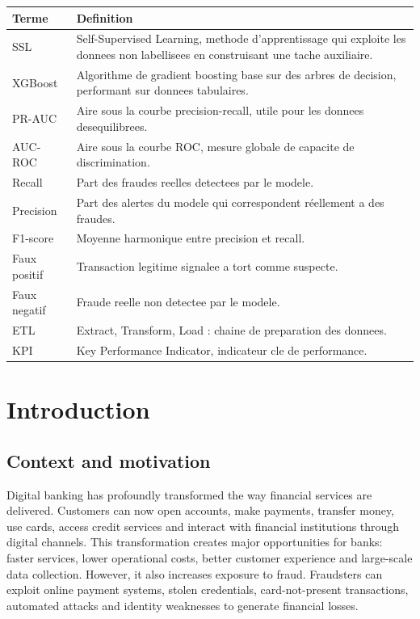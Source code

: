 \documentclass[12pt,a4paper]{report}
\begin{document}
\begin{longtable}{p{3cm}p{11cm}}
\toprule
\textbf{Terme} & \textbf{Definition} \\
\midrule
SSL & Self-Supervised Learning, methode d'apprentissage qui exploite les donnees non labellisees en construisant une tache auxiliaire. \\
XGBoost & Algorithme de gradient boosting base sur des arbres de decision, performant sur donnees tabulaires. \\
PR-AUC & Aire sous la courbe precision-recall, utile pour les donnees desequilibrees. \\
AUC-ROC & Aire sous la courbe ROC, mesure globale de capacite de discrimination. \\
Recall & Part des fraudes reelles detectees par le modele. \\
Precision & Part des alertes du modele qui correspondent réellement a des fraudes. \\
F1-score & Moyenne harmonique entre precision et recall. \\
Faux positif & Transaction legitime signalee a tort comme suspecte. \\
Faux negatif & Fraude reelle non detectee par le modele. \\
ETL & Extract, Transform, Load : chaine de preparation des donnees. \\
KPI & Key Performance Indicator, indicateur cle de performance. \\
\bottomrule
\end{longtable}

\chapter{Introduction}

\section{Context and motivation}

Digital banking has profoundly transformed the way financial services are delivered. Customers can now open accounts, make payments, transfer money, use cards, access credit services and interact with financial institutions through digital channels. This transformation creates major opportunities for banks: faster services, lower operational costs, better customer experience and large-scale data collection. However, it also increases exposure to fraud. Fraudsters can exploit online payment systems, stolen credentials, card-not-present transactions, automated attacks and identity weaknesses to generate financial losses.
\end{document}

